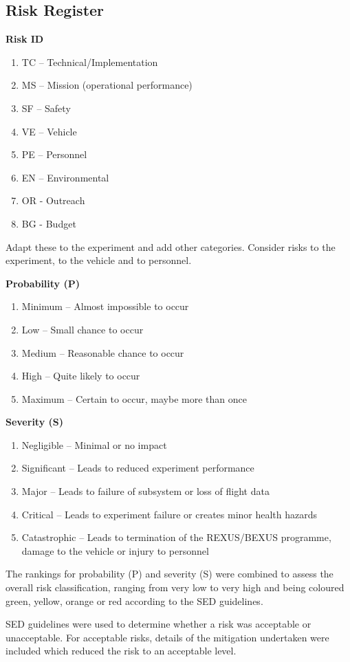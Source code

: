 \pagebreak
\subsection{Risk Register}
\textbf{Risk ID}
\begin{enumerate}[label={}]
    \item TC – Technical/Implementation 
    \item MS – Mission (operational performance) 
    \item SF – Safety 
    \item VE – Vehicle 
    \item PE – Personnel 
    \item EN – Environmental 
    \item OR - Outreach
    \item BG - Budget
\end{enumerate}

Adapt these to the experiment and add other categories. 
Consider risks to the experiment, to the vehicle and to personnel. 

\textbf{Probability (P)}
\begin{enumerate}[label=\Alph*]
    \item Minimum – Almost impossible to occur 
    \item Low – Small chance to occur 
    \item Medium – Reasonable chance to occur 
    \item High – Quite likely to occur 
    \item Maximum – Certain to occur, maybe more than once
\end{enumerate}

\textbf{Severity (S)}
\begin{enumerate}
    \item Negligible – Minimal or no impact 
    \item Significant – Leads to reduced experiment performance 
    \item Major – Leads to failure of subsystem or loss of flight data 
    \item Critical – Leads to experiment failure or creates minor health hazards 
    \item Catastrophic – Leads to termination of the REXUS/BEXUS programme, damage to the vehicle or injury to personnel 
\end{enumerate}

The rankings for probability (P) and severity (S) were combined to assess the overall risk classification, ranging from very low to very high and being coloured green, yellow, orange or red according to the SED guidelines.

SED guidelines were used to determine whether a risk was acceptable or unacceptable. For acceptable risks, details of the mitigation undertaken were included which reduced the risk to an acceptable level.

\begin{landscape}

\end{landscape}